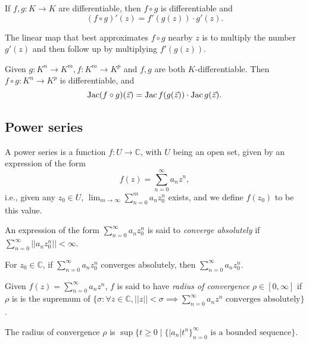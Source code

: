
\begin{lem}
	If $f, g: K \to K$ are differentiable, then $f \circ g$ is differentiable and \[
		(f \circ g)'(z) = f'(g(z)) \cdot g'(z).
	\]
\end{lem}

The linear map that best approximates $f \circ g$ nearby $z$ is to multiply the number $g'(z)$ and then follow up by multiplying $f'(g(z))$.

\begin{lem}
	Given $g: K^n \to K^m, f: K^m \to K^p$ and $f, g$ are both $K$-differentiable. Then $f \circ g: K^n \to K^p$ is differentiable, and \[
		\operatorname{Jac} (f \circ g)(\vec z) = \operatorname{Jac} f (g(\vec z)) \cdot \operatorname{Jac} g(\vec z).
	\]
\end{lem}

\subsection{Power series}

\begin{defn}
	A power series is a function $f: U \to \mathbb{C}$, with $U$ being an open set, given by an expression of the form \[
		f(z) = \sum_{n=0}^\infty a_nz^n,
	\] i.e., given any $z_0 \in U$,  $\lim_{m\to \infty} \sum_{n = 0}^m a_nz_0^n$ exists, and we define $f(z_0)$ to be this value.
\end{defn}

\begin{defn}
	An expression of the form $\sum_{n=0}^\infty a_nz_0^n$ is said to \emph{converge absolutely} if $\sum_{n=0}^\infty ||a_nz_0^n|| < \infty$.
\end{defn}

\begin{prop}
	For $z_0 \in \mathbb{C}$, if $\sum_{n=0}^\infty{a_nz_0^n}$ converges absolutely, then $\sum_{n=0}^\infty a_nz_0^n$.
\end{prop}

\begin{defn}
	Given $f(z) = \sum_{n=0}^\infty a_nz^n$, $f$ is said to have \emph{radius of convergence} $\rho \in [0,\infty]$ if $\rho$ is is the supremum of $\{ \sigma : \forall z \in \mathbb{C}, ||z|| < \sigma \implies  \sum_{n=0}^\infty a_nz^n \text{ converges absolutely}\}$.
\end{defn}

\begin{prop}
	The radius of convergence $\rho$ is $\sup\{t \ge 0 \mid \{|a_n|t^n\}_{n=0}^\infty \text{ is a bounded sequence}\}$.
\end{prop}

